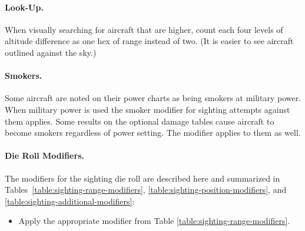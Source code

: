 {{\paragraph{Look-Up.} When visually searching for aircraft that are higher, count each four levels of altitude difference as one hex of range instead of two. (It is easier to see aircraft outlined against the sky.) 
\paragraph{Smokers.} Some aircraft are noted on their power charts as being smokers at military power. When military power is used the smoker modifier for sighting attempts against them applies. Some results on the optional damage tables cause aircraft to become smokers regardless of power setting. The modifier applies to them as well.
}
}{

\paragraph{Die Roll Modifiers.} The modifiers for the sighting die roll are described here and summarized in Tables~\ref{table:sighting-range-modifiers}, \ref{table:sighting-position-modifiers}, and \ref{table:sighting-additional-modifiers}:

\begin{itemize}
    \item {} Apply the appropriate modifier from Table \ref{table:sighting-range-modifiers}. 
    
    
    

\end{itemize}}
